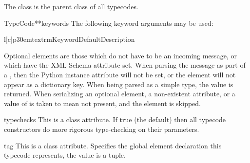 The  class is the parent class of all typecodes.

\begin{classdesc}{TypeCode}{**keywords}
The following keyword arguments may be used:

\begin{tableiii}{l|c|p{30em}}{textrm}{Keyword}{Default}{Description}


\end{tableiii}

Optional elements are those which do not have to be an incoming
message, or which have the XML Schema  attribute set.
When parsing the message as part of a , then the Python
instance attribute will not be set, or the element will not appear as
a dictionary key.
When being parsed as a simple type, the value  is returned.
When serializing an optional element, a non-existent attribute, or a value
of  is taken to mean not present, and the element is skipped.

\end{classdesc}

\begin{memberdesc}{typechecks}
This is a class attribute.
If true (the default) then all typecode constructors do more
rigorous type-checking on their parameters.
\end{memberdesc}

\begin{memberdesc}{tag}
This is a class attribute.
Specifies the global element declaration this typecode represents, the value is
a  tuple.
\end{memberdesc}

